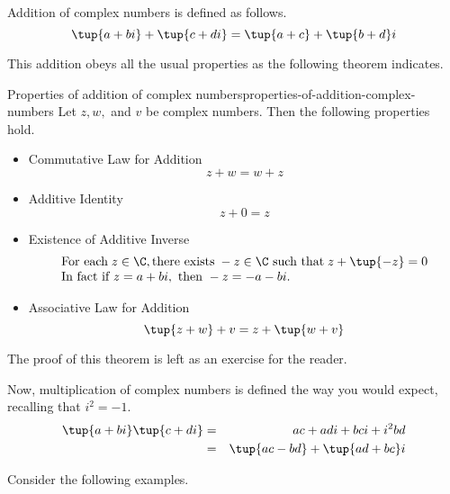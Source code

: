 Addition of complex numbers is defined as follows.
\begin{equation*}
\tup{a+bi} +\tup{c+di} =\tup{a+c} +\tup{b+d}i
\end{equation*}

This addition obeys all the usual properties as the following theorem indicates.

\begin{theorem}{Properties of addition of complex numbers}{properties-of-addition-complex-numbers}
Let $z,w,$ and $v$ be complex numbers. Then the following properties hold.
\begin{itemize}
\item Commutative Law for Addition
\begin{equation*}
z+w=w+z
\end{equation*}

\item Additive Identity
\begin{equation*}
z+0=z
\end{equation*}

\item Existence of Additive Inverse
\begin{equation*}
\begin{array}{l}
\mbox{For each} \; z\in \C, \mbox{there exists}\; -z\in \C \mbox{ such that}\; 
z+\tup{-z} =0 \\
\mbox{In fact if } z=a+bi, \mbox{ then } -z=-a-bi.
\end{array}
\end{equation*}

\item Associative Law for Addition
\begin{equation*}
\tup{z+w} +v= z +\tup{w+v}
\end{equation*}
\end{itemize}
\end{theorem}

The proof of this theorem is left as an exercise for the reader.

Now, multiplication of complex numbers is defined the way you would expect, recalling that $i^{2} = -1$.
\begin{eqnarray*}
\tup{a+bi} \tup{c+di} &=&ac+adi+bci+i^{2}bd \\
&=&\tup{ac-bd} +\tup{ad + bc }i 
\end{eqnarray*}

Consider the following examples.


